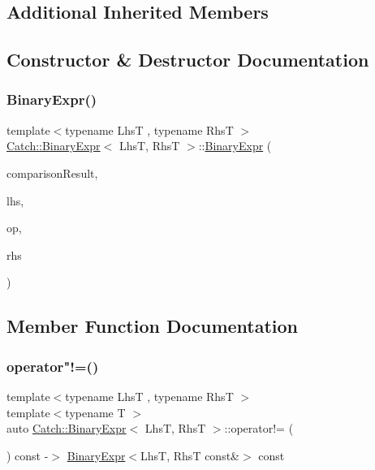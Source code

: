 \subsection*{Additional Inherited Members}


\subsection{Constructor \& Destructor Documentation}
\mbox{\label{class_catch_1_1_binary_expr_a657d66346aef97a760c22776fe6008b6}} 
\subsubsection{\texorpdfstring{Binary\+Expr()}{BinaryExpr()}}
{\footnotesize\ttfamily template$<$typename LhsT , typename RhsT $>$ \\
\mbox{\hyperlink{class_catch_1_1_binary_expr}{Catch\+::\+Binary\+Expr}}$<$ LhsT, RhsT $>$\+::\mbox{\hyperlink{class_catch_1_1_binary_expr}{Binary\+Expr}} (\begin{DoxyParamCaption}\item[{bool}]{comparison\+Result,  }\item[{LhsT}]{lhs,  }\item[{\mbox{\hyperlink{class_catch_1_1_string_ref}{String\+Ref}}}]{op,  }\item[{RhsT}]{rhs }\end{DoxyParamCaption})\hspace{0.3cm}{\ttfamily [inline]}}



\subsection{Member Function Documentation}
\mbox{\label{class_catch_1_1_binary_expr_a1c5d4b87cc18452ebe1254e0067dd476}} 
\subsubsection{\texorpdfstring{operator"!=()}{operator!=()}}
{\footnotesize\ttfamily template$<$typename LhsT , typename RhsT $>$ \\
template$<$typename T $>$ \\
auto \mbox{\hyperlink{class_catch_1_1_binary_expr}{Catch\+::\+Binary\+Expr}}$<$ LhsT, RhsT $>$\+::operator!= (\begin{DoxyParamCaption}\item[{T}]{ }\end{DoxyParamCaption}) const -\/$>$ \mbox{\hyperlink{class_catch_1_1_binary_expr}{Binary\+Expr}}$<$LhsT, RhsT const\&$>$ const \hspace{0.3cm}{\ttfamily [inline]}}


